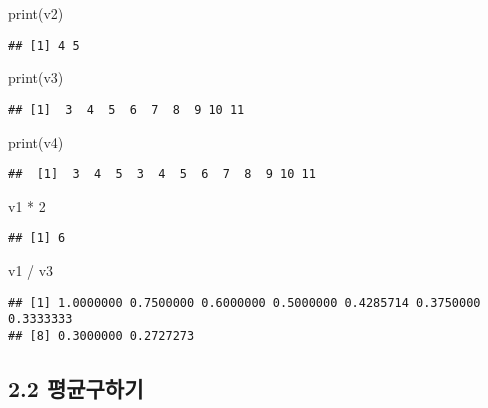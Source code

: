 \documentclass[
]{article}
\newenvironment{Shaded}{\begin{snugshade}}{\end{snugshade}}
\newcommand{\DecValTok}[1]{\textcolor[rgb]{0.00,0.00,0.81}{#1}}
\newcommand{\FunctionTok}[1]{\textcolor[rgb]{0.00,0.00,0.00}{#1}}
\newcommand{\NormalTok}[1]{#1}
\newcommand{\SpecialCharTok}[1]{\textcolor[rgb]{0.00,0.00,0.00}{#1}}
\begin{document}
\begin{Shaded}
\begin{Highlighting}[]
\FunctionTok{print}\NormalTok{(v2)}
\end{Highlighting}
\end{Shaded}

\begin{verbatim}
## [1] 4 5
\end{verbatim}

\begin{Shaded}
\begin{Highlighting}[]
\FunctionTok{print}\NormalTok{(v3)}
\end{Highlighting}
\end{Shaded}

\begin{verbatim}
## [1]  3  4  5  6  7  8  9 10 11
\end{verbatim}

\begin{Shaded}
\begin{Highlighting}[]
\FunctionTok{print}\NormalTok{(v4)}
\end{Highlighting}
\end{Shaded}

\begin{verbatim}
##  [1]  3  4  5  3  4  5  6  7  8  9 10 11
\end{verbatim}

\begin{Shaded}
\begin{Highlighting}[]
\NormalTok{v1 }\SpecialCharTok{*} \DecValTok{2}
\end{Highlighting}
\end{Shaded}

\begin{verbatim}
## [1] 6
\end{verbatim}

\begin{Shaded}
\begin{Highlighting}[]
\NormalTok{v1 }\SpecialCharTok{/}\NormalTok{ v3}
\end{Highlighting}
\end{Shaded}

\begin{verbatim}
## [1] 1.0000000 0.7500000 0.6000000 0.5000000 0.4285714 0.3750000 0.3333333
## [8] 0.3000000 0.2727273
\end{verbatim}

\hypertarget{uxd3c9uxade0uxad6cuxd558uxae30}{%
\subsection{2.2 평균구하기}\label{uxd3c9uxade0uxad6cuxd558uxae30}}
\end{document}
